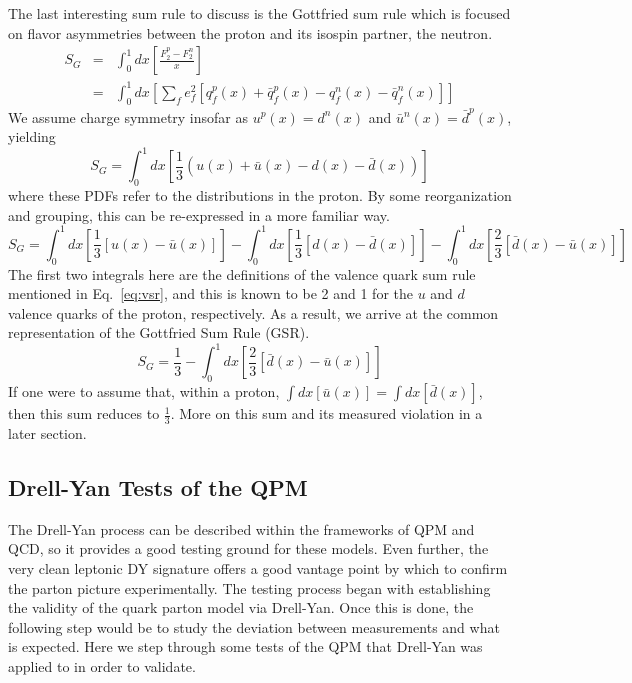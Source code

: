 The last interesting sum rule to discuss is the Gottfried sum rule which is focused on flavor asymmetries between the proton and its isospin partner, the neutron.
\begin{eqnarray}
  S_G & = & \int_0^1 dx \left[\frac{F_2^p - F_2^n}{x}\right] \\
  & = & \int_0^1 dx \left[ \sum\limits_f e_f^2 [q_f^p(x) + \bar{q}_f^p(x) - q_f^n(x) - \bar{q}_f^n(x)] \right]
\end{eqnarray}
We assume charge symmetry insofar as $u^p(x) = d^n(x)$ and $\bar{u}^n (x) = \bar{d}^p(x)$, yielding
\begin{equation}
S_G = \int_0^1 dx \left[ \frac{1}{3} (u(x) + \bar{u}(x) - d(x) - \bar{d}(x)) \right]
\end{equation}
where these PDFs refer to the distributions in the proton. By some reorganization and grouping, this can be re-expressed in a more familiar way.
\begin{equation}
S_G = \int_0^1 dx \left[\frac{1}{3} [u(x) - \bar{u}(x)] \right] - 
      \int_0^1 dx \left[\frac{1}{3} [d(x) - \bar{d}(x)] \right] -
      \int_0^1 dx \left[\frac{2}{3} [\bar{d}(x) - \bar{u}(x)] \right]
\end{equation}
The first two integrals here are the definitions of the valence quark sum rule mentioned in Eq.~\ref{eq:vsr}, and this is known to be 2 and 1 for the $u$ and $d$ valence quarks of the proton, respectively. As a result, we arrive at the common representation of the Gottfried Sum Rule (GSR).
\begin{equation}
	  S_G = \frac{1}{3} - \int_0^1 dx \left[ \frac{2}{3} [\bar{d}(x) - \bar{u}(x)] \right]
      \label{eq:gsr}
\end{equation}
If one were to assume that, within a proton, $\int dx [\bar{u}(x)] = \int dx[\bar{d}(x)]$, then this sum reduces to $\frac{1}{3}$. More on this sum and its measured violation in a later section.

\subsection{Drell-Yan Tests of the QPM}

The Drell-Yan process can be described within the frameworks of QPM and QCD, so it provides a good testing ground for these models. Even further, the very clean leptonic DY signature offers a good vantage point by which to confirm the parton picture experimentally. The testing process began with establishing the validity of the quark parton model via Drell-Yan. Once this is done, the following step would be to study the deviation between measurements and what is expected. Here we step through some tests of the QPM that Drell-Yan was applied to in order to validate.

